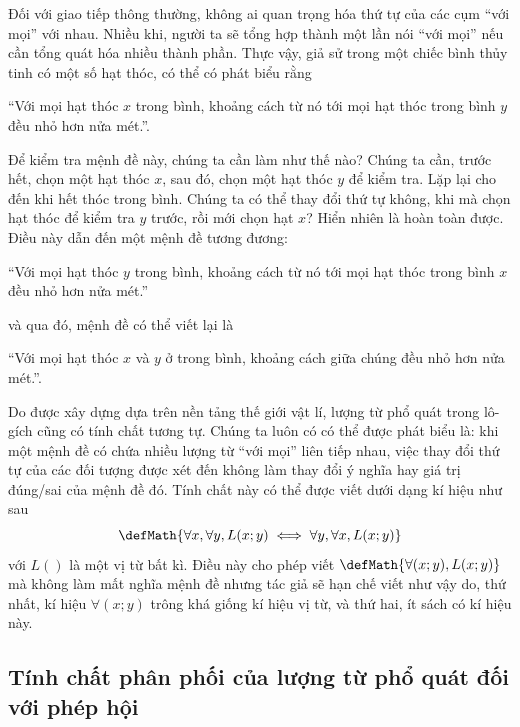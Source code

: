 Đối với giao tiếp thông thường, không ai quan trọng hóa thứ tự của các cụm ``với mọi'' với nhau. Nhiều khi, người ta sẽ tổng hợp thành một lần nói ``với mọi'' nếu cần tổng quát hóa nhiều thành phần. Thực vậy, giả sử trong một chiếc bình thủy tinh có một số hạt thóc, có thể có phát biểu rằng
\begin{center}
    ``Với mọi hạt thóc $x$ trong bình, khoảng cách từ nó tới mọi hạt thóc trong bình $y$ đều nhỏ hơn nửa mét.''.
\end{center}
Để kiểm tra mệnh đề này, chúng ta cần làm như thế nào? Chúng ta cần, trước hết, chọn một hạt thóc $x$, sau đó, chọn một hạt thóc $y$ để kiểm tra. Lặp lại cho đến khi hết thóc trong bình. Chúng ta có thể thay đổi thứ tự không, khi mà chọn hạt thóc để kiểm tra $y$ trước, rồi mới chọn hạt $x$? Hiển nhiên là hoàn toàn được. Điều này dẫn đến một mệnh đề tương đương:
\begin{center}
    ``Với mọi hạt thóc $y$ trong bình, khoảng cách từ nó tới mọi hạt thóc trong bình $x$ đều nhỏ hơn nửa mét.''
\end{center}
và qua đó, mệnh đề có thể viết lại là
\begin{center}
    ``Với mọi hạt thóc $x$ và $y$ ở trong bình, khoảng cách giữa chúng đều nhỏ hơn nửa mét.''.
\end{center}

Do được xây dựng dựa trên nền tảng thế giới vật lí, lượng từ phổ quát trong lô-gích cũng có tính chất tương tự. Chúng ta luôn có  có thể được phát biểu là: khi một mệnh đề có chứa nhiều lượng từ ``với mọi'' liên tiếp nhau, việc thay đổi thứ tự của các đối tượng được xét đến không làm thay đổi ý nghĩa hay giá trị đúng/sai của mệnh đề đó. Tính chất này có thể được viết dưới dạng kí hiệu như sau
\begin{equation*}
    \defMath{\forall x, \forall y, L(x; y) \iff \forall y, \forall x, L(x; y)}
\end{equation*}
với $L()$ là một vị từ bất kì. Điều này cho phép viết $\defMath{\forall(x; y), L(x; y)}$ mà không làm mất nghĩa mệnh đề nhưng tác giả sẽ hạn chế viết như vậy do, thứ nhất, kí hiệu $\forall(x; y)$ trông khá giống kí hiệu vị từ, và thứ hai, ít sách có kí hiệu này.

\subsection{Tính chất phân phối của lượng từ phổ quát đối với phép hội}

\

